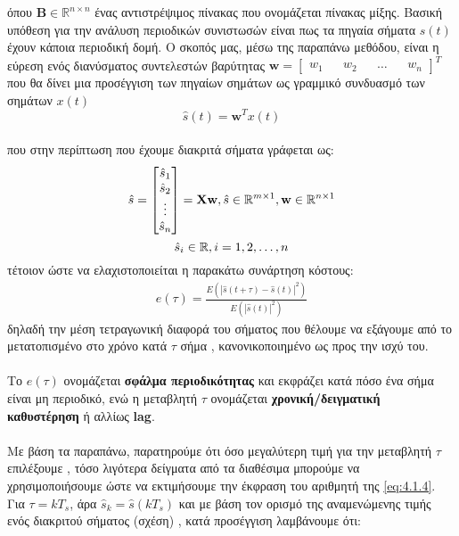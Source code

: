  όπου $\mathbf{B} \in \mathbb{R}^{n\times n}$ ένας αντιστρέψιμος πίνακας που ονομάζεται πίνακας μίξης.
\newpage
\noindent Βασική υπόθεση για την ανάλυση περιοδικών συνιστωσών είναι πως τα πηγαία σήματα $s(t)$ έχουν κάποια περιοδική δομή. Ο σκοπός μας, μέσω της παραπάνω μεθόδου, είναι η εύρεση ενός διανύσματος συντελεστών βαρύτητας
$\mathbf{w} = \begin{bmatrix} w_1 && w_2 && \ldots && w_n \end{bmatrix}^T$ που θα δίνει μια προσέγγιση των πηγαίων σημάτων ως γραμμικό συνδυασμό των σημάτων $x(t)$
$$
\hat{s}(t) = \mathbf{w}^T x(t)
$$
\\ 
 που στην περίπτωση που έχουμε διακριτά σήματα γράφεται ως:
 \begin{align}\label{eq:4.1.3}
     \hat{s} = \begin{bmatrix} \hat{s}_1 \\ \hat{s}_2 \\
     \vdots \\ \hat{s}_n
     \end{bmatrix} = \mathbf{X}\mathbf{w} ,
     \hat{s} \in \mathbb{R}^{m\times 1} \space , \mathbf{w} \in 
     \mathbb{R}^{n\times 1}
 \end{align}
 $$ \\ \hat{s}_i \in \mathbb{R} , i = 1 , 2 , \ldots , n $$
 τέτοιον ώστε να ελαχιστοποιείται η παρακάτω συνάρτηση κόστους:
 \begin{align}\label{eq:4.1.4}
     e(\tau) = \frac {E(\left | \hat{s}(t+\tau) - \hat{s}(t) \right | ^2)} {E(\left | \hat{s}(t) \right | ^2)}
 \end{align}
 δηλαδή την μέση τετραγωνική διαφορά του σήματος που θέλουμε να εξάγουμε από το μετατοπισμένο στο χρόνο κατά  $\tau$ σήμα , κανονικοποιημένο ως προς την ισχύ του. 
 \\ \\ 
 Το $e(\tau)$ ονομάζεται \textbf{σφάλμα περιοδικότητας} και εκφράζει κατά πόσο ένα σήμα είναι μη περιοδικό, ενώ η μεταβλητή $\tau$ ονομάζεται \textbf{χρονική/δειγματική καθυστέρηση} ή αλλίως \textbf{lag}.
 \\ \\
 Με βάση τα παραπάνω, παρατηρούμε ότι όσο μεγαλύτερη τιμή για την μεταβλητή $\tau$ επιλέξουμε , τόσο λιγότερα δείγματα από τα διαθέσιμα μπορούμε να χρησιμοποιήσουμε ώστε να εκτιμήσουμε την έκφραση του αριθμητή της \eqref{eq:4.1.4}. Για $\tau = kT_s$, άρα $\hat{s}_k = \hat{s}(kT_s)$ και με βάση τον ορισμό της αναμενώμενης τιμής ενός διακριτού σήματος (σχέση) %
 , κατά προσέγγιση λαμβάνουμε ότι:
